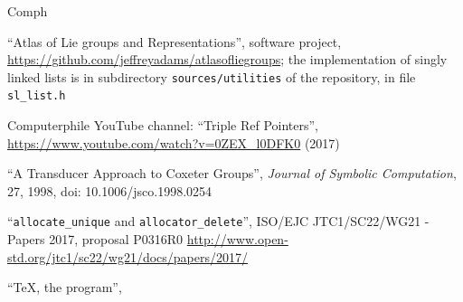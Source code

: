\documentclass[12pt]{article}
\theoremstyle{plain}
\theoremstyle{definition}
\begin{document}
\begin{thebibliography}{Comph}

\newcommand\tit[1]{\newblock ``#1'',}
\newcommand\journ[3]{\newblock \textit{#1}, \textbf{#2} (#3),}
\newcommand\publ[2]{\newblock \textit{#1}, #2,}
\newcommand\doi[1]{\newblock doi: #1}

  \tit{Atlas of Lie groups and Representations} software project,
  \hfil\break\url{https://github.com/jeffreyadams/atlasofliegroups}; the
  implementation of singly linked lists is in subdirectory
  \texttt{sources/utilities} of the repository, in file \texttt{sl\_list.h}

  Computerphile YouTube channel: \tit{Triple Ref Pointers}
  \hfil\break\url{https://www.youtube.com/watch?v=0ZEX_l0DFK0} (2017)

  \tit{A Transducer Approach to Coxeter Groups}
  \publ{Journal of Symbolic Computation}{27, 1998}
  \doi{10.1006/jsco.1998.0254}

    \author{Miro Knejp}
    \tit{\texttt{allocate\_unique} and \texttt{allocator\_delete}}
    ISO/EJC JTC1/SC22/WG21 - Papers 2017, proposal P0316R0
    \hfil\break\url{http://www.open-std.org/jtc1/sc22/wg21/docs/papers/2017/}

  \author{D.~E. Knuth}
  \tit{\TeX, the program}

\end{thebibliography}
\end{document}
